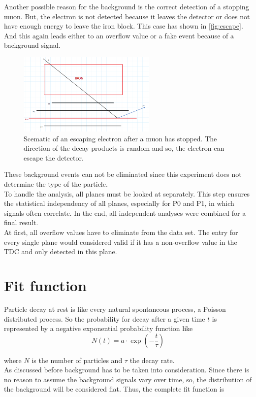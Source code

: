 Another possible reason for the background is the correct detection of a stopping muon. But, the electron is not detected because it leaves the detector or does not have enough energy to leave the iron block. This case has shown in \autoref{fig:escape}. And this again leads either to an overflow value or a fake event because of a background signal.

\begin{figure}
	 \centering
	 \includegraphics[width=0.6\textwidth]{figures/electron_escape.png}
	 \caption{Scematic of an escaping electron after a muon has stopped. The direction of the decay products is random and so, the electron can escape the detector.}
	 \label{fig:escape}
\end{figure}

These background events can not be eliminated since this experiment does not determine the type of the particle.\\
To handle the analysis, all planes must be looked at separately. This step ensures the statistical independency of all planes, especially for P0 and P1, in which signals often correlate. In the end, all independent analyses were combined for a final result.\\
At first, all overflow values have to eliminate from the data set. The entry for every single plane would considered valid if it has a non-overflow value in the TDC and only detected in this plane.

\section{Fit function}
Particle decay at rest is like every natural spontaneous process, a Poisson distributed process. So the probability for decay after a given time $t$ is represented by a negative exponential probability function
like 
\begin{equation*}
    N(t) = a \cdot \exp(- \frac{t}{\tau})
\end{equation*}

where $N$ is the number of particles and $\tau$ the decay rate.\\ As discussed before background has to be taken into consideration. Since there is no reason to assume the background signals vary over time, so, the distribution of the background will be considered flat. Thus, the complete fit function is 

